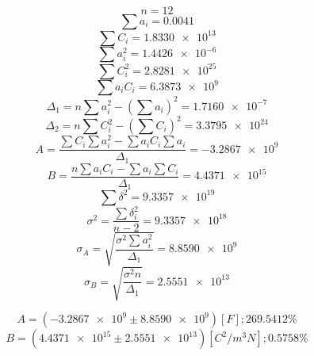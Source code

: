 \documentclass[letter,11pt]{article}
\begin{document}
\begin{equation*}
    n = 12
\end{equation*}
\begin{equation*}
    \sum a_i = 0.0041
\end{equation*}
\begin{equation*}
    \sum C_i = \num{1.8330e13}
\end{equation*}
\begin{equation*}
    \sum a^2_i = \num{1.4426e-6}
\end{equation*}
\begin{equation*}
    \sum C^2_i = \num{2.8281e25}
\end{equation*}
\begin{equation*}
    \sum a_i C_i = \num{6.3873e9}
\end{equation*}
\begin{equation*}
    \Delta_1 = n \sum a^2_i - \left( \sum a_i \right)^2 = \num{1.7160e-7}
\end{equation*}
\begin{equation*}
    \Delta_2 = n \sum C^2_i - \left( \sum C_i \right)^2 = \num{3.3795e24}
\end{equation*}
\begin{equation*}
    A = \frac{\sum C_i \sum a^2_i - \sum a_i C_i \sum a_i}{\Delta_1} = \num{-3.2867e9}
\end{equation*}
\begin{equation*}
    B = \frac{n \sum a_i C_i - \sum a_i \sum C_i}{\Delta_1} = \num{4.4371e15}
\end{equation*}
\begin{equation*}
    \sum \delta^2 = \num{9.3357e19}
\end{equation*}
\begin{equation*}
    \sigma^2 = \frac{\sum \delta^2_i}{n-2} = \num{9.3357e18}
\end{equation*}
\begin{equation*}
    \sigma_A = \sqrt{\frac{\sigma^2 \sum a^2_i}{\Delta_1}} = \num{8.8590e9}
\end{equation*}
\begin{equation*}
    \sigma_B = \sqrt{\frac{\sigma^2 n}{\Delta_1}} = \num{2.5551e13}
\end{equation*}

\begin{equation*}
    A = (\num{-3.2867e9} \pm \num{8.8590e9})[F]; 269.5412\%
\end{equation*}
\begin{equation*}
    B = (\num{4.4371e15} \pm \num{2.5551e13})[C^2/m^3 N]; 0.5758\%
\end{equation*}
\end{document}
